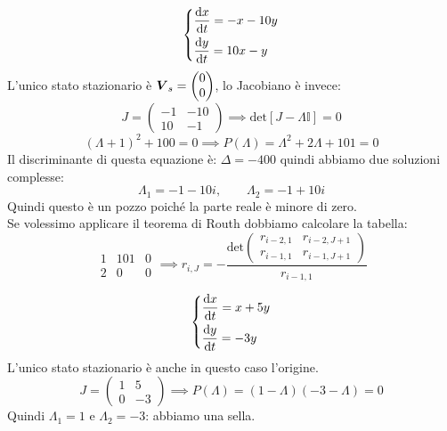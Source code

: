 \begin{exmp}
    \[\begin{dcases}
        \frac{\text{d} x}{\text{d} t}  = - x - 10 y \\
	\frac{\text{d} y}{\text{d} t} = 10x - y
    \end{dcases}\] 
    L'unico stato stazionario è $\boldsymbol{V}_s = \begin{pmatrix} 0 \\ 0 \end{pmatrix} $, lo Jacobiano è invece:
    \[
	J = \begin{pmatrix} -1 & -10 \\ 10 & -1 \end{pmatrix} \implies\text{det}\left[J-\Lambda\mathbb{I}\right] = 0
    \] 
    \[
	\left(\Lambda+1\right)^2+ 100 = 0 \implies  P(\Lambda)=\Lambda^2 + 2\Lambda  + 101 = 0
    \] 
    Il discriminante di questa equazione è: $\Delta =-400$ quindi abbiamo due soluzioni complesse:
    \[
        \Lambda_1=-1-10i, \qquad \Lambda_2 = -1+10i
    \] 
    Quindi questo è un pozzo poiché la parte reale è minore di zero.\\
    Se volessimo applicare il teorema di Routh dobbiamo calcolare la tabella:
    \[
        \begin{matrix}
	    1 & 101 & 0 \\
	    2 & 0   & 0
        \end{matrix}
	\implies  r_{i, J}=- \frac{\text{det}\begin{pmatrix} r_{i-2,1} & r_{i-2, J+1} \\ r_{i-1, 1} & r_{i-1, J+1} \end{pmatrix}}{r_{i-1,1}}
    \] 
\end{exmp}
\noindent
\begin{exmp}
    \[\begin{dcases}
        \frac{\text{d} x}{\text{d} t} = x + 5 y\\
	\frac{\text{d} y}{\text{d} t} = -3y
    \end{dcases}\] 
    L'unico stato stazionario è anche in questo caso l'origine. 
    \[
	J = \begin{pmatrix} 1 & 5 \\ 0 & -3 \end{pmatrix} \implies  P(\Lambda)=(1-\Lambda)(-3-\Lambda)=0
    \] 
    Quindi $\Lambda_1=1$ e $\Lambda_2=-3$: abbiamo una sella.
\end{exmp}
\noindent
